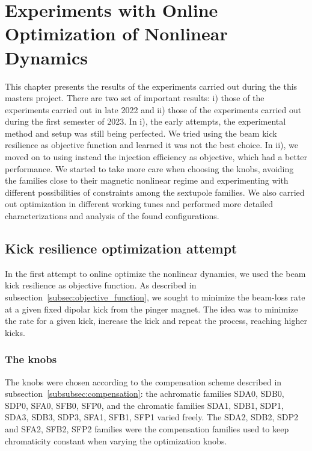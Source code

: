 \chapter{Experiments with Online Optimization of Nonlinear Dynamics}
This chapter presents the results of the experiments carried out during the this masters project. There are two set of important results: i) those of the experiments carried out in late 2022 and ii) those of the experiments carried out during the first semester of 2023. In i), the early attempts, the experimental method and setup was still being perfected. We tried using the beam kick resilience as objective function and learned it was not the best choice. In ii), we moved on to using instead the injection efficiency as objective, which had a better performance.  We started to take more care when choosing the knobs, avoiding the families close to their magnetic nonlinear regime and experimenting with different possibilities of constraints among the sextupole families. We also carried out optimization in different working tunes and performed more detailed characterizations and analysis of the found configurations.
\section{Kick resilience optimization attempt}
In the first attempt to online optimize the nonlinear dynamics, we used the beam kick resilience as objective function. As described in subsection~\ref{subsec:objective_function}, we sought to minimize the beam-loss rate at a given fixed dipolar kick from the pinger magnet. The idea was to minimize the rate for a given kick, increase the kick and repeat the process, reaching higher kicks.
\subsection{The knobs}
The knobs were chosen according to the compensation scheme described in subsection~\ref{subsubsec:compensation}: the achromatic families SDA0, SDB0, SDP0, SFA0, SFB0, SFP0, and the chromatic families SDA1, SDB1, SDP1, SDA3, SDB3, SDP3, SFA1, SFB1, SFP1 varied freely. The SDA2, SDB2, SDP2 and SFA2, SFB2, SFP2 families were the compensation families used to keep chromaticity constant when varying the optimization knobs.
